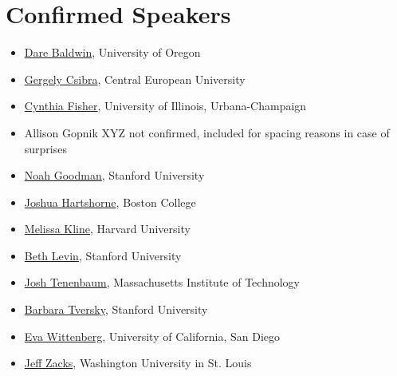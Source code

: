 \documentclass[10pt,letterpaper]{article}
\begin{document}
\section{Confirmed Speakers}

\begin{itemize}
\item[] \href{http://baldwinlab.uoregon.edu/dr-dare-baldwin/}{Dare Baldwin}, University of Oregon
\item[] \href{https://people.ceu.edu/gergely_csibra}{Gergely Csibra}, Central European University  
\item[] \href{http://www.psychology.illinois.edu/people/clfishe}{Cynthia Fisher}, University of Illinois, Urbana-Champaign
\item[] Allison Gopnik XYZ not confirmed, included for spacing reasons in case of surprises
\item[] \href{http://cocolab.stanford.edu/ndg.html}{Noah Goodman}, Stanford University
\item[] \href{http://joshuakhartshorne.org/}{Joshua Hartshorne}, Boston College
\item[] \href{http://www.melissakline.net/}{Melissa Kline}, Harvard University
\item[] \href{http://web.stanford.edu/~bclevin/}{Beth Levin}, Stanford University
\item[] \href{http://web.mit.edu/cocosci/josh.html}{Josh Tenenbaum}, Massachusetts Institute of Technology
\item[] \href{http://www-psych.stanford.edu/~bt/}{Barbara Tversky}, Stanford University
\item[] \href{http://evawittenberg.com/i/start.html}{Eva Wittenberg}, University of California, San Diego  
\item[] \href{http://pages.wustl.edu/dcl/jeff-zacks/}{Jeff Zacks}, Washington University in St. Louis
\end{itemize}
\end{document}
